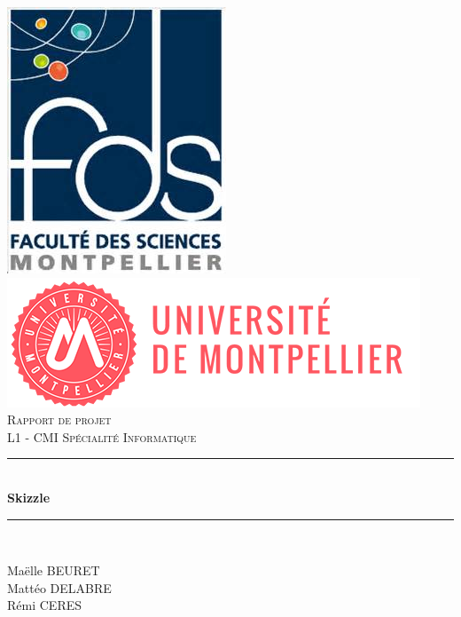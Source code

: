 \documentclass[12pt]{report}
\newcommand{\HRule}{\rule{\linewidth}{0.5mm}}
\begin{document}
	
	
	\begin{titlepage}
		\begin{sffamily}
			\begin{center}
				
				\includegraphics[scale=0.4]{logo_fds.jpg}~
				\\[1cm]
				\includegraphics[scale=0.5]{img1.png}~\\[1.5cm]
				
				\textsc{\Large Rapport de projet}\\[1.5cm]
				\textsc{\Large L1 - CMI Spécialité Informatique}\\[1.5cm]
				
				\HRule \\[0.4cm]
				{ \huge \bfseries Skizzle\\[0.4cm] }
				
				\HRule \\[2cm]

				
				\begin{minipage}{0.4\textwidth}
					\begin{flushleft} \large
						Maëlle \textsc{BEURET}\\
						Mattéo \textsc{DELABRE}\\
						Rémi \textsc{CERES}\\
						

\end{flushleft}
\end{minipage}
\end{center}
\end{sffamily}
\end{titlepage}
\end{document}
